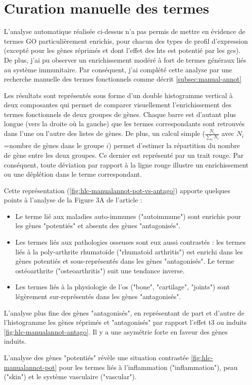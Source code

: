 \documentclass[../main.tex]{subfiles}
\begin{document}
\section{Curation manuelle des termes}
L'analyse automatique réalisée ci-dessus n'a pas permis de mettre en évidence de termes GO particulièrement enrichis, pour chacun des types de profil d'expression (excepté pour les gènes réprimés et dont l'effet des \glspl{ht} est potentié par les \glspl{gc}).
De plus, j'ai pu observer un enrichissement modéré à fort de termes généraux liés au système immunitaire. Par conséquent, j'ai complété cette analyse par une recherche manuelle des termes fonctionnels comme décrit \autoref{subsec:manual-annot}
\par
Les résultats sont représentés sous forme d'un double histogramme vertical à deux composantes qui permet de comparer visuellement l'enrichissement des termes fonctionnels de deux groupes de gènes.
Chaque barre est d'autant plus longue (vers la droite où la gauche) que les termes correspondants sont retrouvés dans l'une ou l'autre des listes de gènes.
De plus, un calcul simple ($\frac{N_{i}}{\sum_{i}N_{i}}$ avec $N_i$=nombre de gènes dans le groupe $i$) permet d'estimer la répartition du nombre de gène entre les deux groupes.
Ce dernier est représenté par un trait rouge. Par conséquent, toute déviation par rapport à la ligne rouge illustre un enrichissement ou une déplétion dans le terme correspondant.
\par
Cette représentation (\autoref{fig:hlc-manualannot-pot-vs-antago}) apporte quelques points à l'analyse de la Figure 3A de l'article :
\begin{itemize} 
\item Le terme lié aux maladies auto-immunes ("autoimmune") sont enrichis pour les gènes "potentiés" et absents des gènes "antagonisés". 
\item Les termes liés aux pathologies osseuses sont eux aussi contrastés :
les termes liés à la poly-arthrite rhumatoïde ("rhumatoid arthritis") est enrichi dans les gènes potentiés et sous-représentés dans les gènes "antagonisés".
Le terme ostéoarthrite ("osteoarthritis") suit une tendance inverse.
\item Les termes liés à la physiologie de l'os ("bone", "cartilage", "joints") sont légèrement sur-représentés dans les gènes "antagonisés".
\end{itemize}


L'analyse plus fine des gènes "antagonisés", en représentant de part et d'autre de l'histogramme les gènes réprimés et "antagonisés" par rapport l'effet \gls{t3} ou induits \autoref{fig:hlc-manualannot-antago}.
Il y a une asymétrie forte en faveur des gènes induits.



L'analyse des gènes "potentiés" révèle une situation contrastée \autoref{fig:hlc-manualannot-pot} pour les termes liés à l'inflammation ("inflammation"), peau ("skin") et le système vasculaire ("vascular"). 


\end{document}
